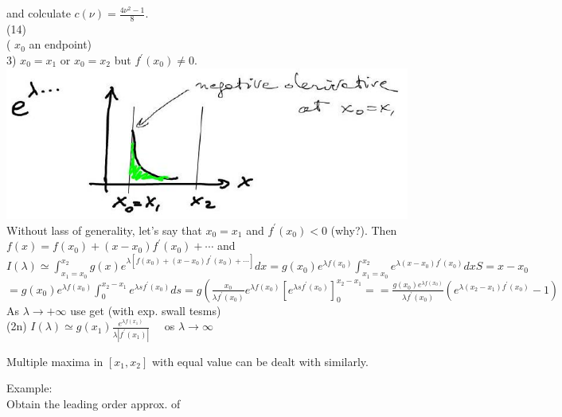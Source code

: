 \documentclass[10pt]{article}
\begin{document}
and colculate $c(\nu)=\frac{4 \nu^{2}-1}{8}$.\\
(14)\\
( $x_{0}$ an endpoint)\\
3) $x_{0}=x_{1}$ or $x_{0}=x_{2}$ but $f^{\prime}\left(x_{0}\right) \neq 0$.\\
\includegraphics[max width=\textwidth, center]{2025_10_17_86b952e516931f75c0b7g-07}\\
Without lass of generality, let's say that $x_{0}=x_{1}$ and $f^{\prime}\left(x_{0}\right)<0$ (why?). Then $f(x)=f\left(x_{0}\right)+\left(x-x_{0}\right) f^{\prime}\left(x_{0}\right)+\cdots$ and\\
$I(\lambda) \simeq \int_{x_{1}=x_{0}}^{x_{2}} g(x) e^{\lambda\left[f\left(x_{0}\right)+\left(x-x_{0}\right) f^{\prime}\left(x_{0}\right)+\cdots\right]} d x=g\left(x_{0}\right) e^{\lambda f\left(x_{0}\right)} \int_{x_{1}=x_{0}}^{x_{2}} e^{\lambda\left(x-x_{0}\right) f^{\prime}\left(x_{0}\right)} d x S=x-x_{0}$\\
$=g\left(x_{0}\right) e^{\lambda f\left(x_{0}\right)} \int_{0}^{x_{2}-x_{1}} e^{\lambda s f^{\prime}\left(x_{0}\right)} d s=g\left(\frac{x_{0}}{\lambda f^{\prime}\left(x_{0}\right)} e^{\lambda f\left(x_{0}\right)}\left[e^{\lambda s f^{\prime}\left(x_{0}\right)}\right]_{0}^{x_{2}-x_{1}}=\right. =\frac{g\left(x_{0}\right) e^{\lambda f\left(x_{0}\right)}}{\lambda f^{\prime}\left(x_{0}\right)}\left(e^{\lambda\left(x_{2}-x_{1}\right) f^{\prime}\left(x_{0}\right)}-1\right)$\\
As $\lambda \rightarrow+\infty$ use get (with exp. swall tesms)\\
(2n) $I(\lambda) \simeq g\left(x_{1}\right) \frac{e^{\lambda f\left(x_{1}\right)}}{\lambda\left|f^{\prime}\left(x_{1}\right)\right|} \quad$ os $\lambda \longrightarrow \infty$

Multiple maxima in $\left[x_{1}, x_{2}\right]$ with equal value can be dealt with similarly.

Example:\\
Obtain the leading order approx. of
\end{document}
